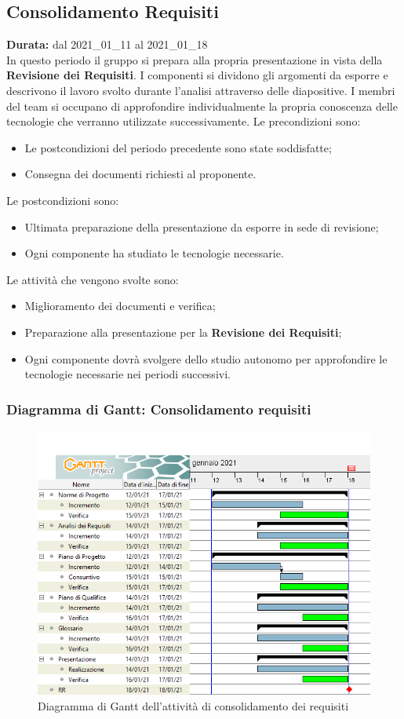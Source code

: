 \subsection{Consolidamento Requisiti}
\label{consolidamento_requisiti}
\textbf{Durata:} dal 2021\_01\_11 al 2021\_01\_18\\
In questo periodo il gruppo si prepara alla propria presentazione in vista della \textbf{Revisione dei Requisiti}.
I componenti si dividono gli argomenti da esporre e descrivono il lavoro svolto durante l'analisi attraverso delle diapositive.
I membri del team si occupano di approfondire individualmente la propria conoscenza delle tecnologie che verranno utilizzate successivamente.
Le precondizioni sono:
\begin{itemize}
    \item Le postcondizioni del periodo precedente sono state soddisfatte;
    \item Consegna dei documenti richiesti al proponente.
\end{itemize}
Le postcondizioni sono:
\begin{itemize}
    \item Ultimata preparazione della presentazione da esporre in sede di revisione;
    \item Ogni componente ha studiato le tecnologie necessarie.
\end{itemize}
Le attività che vengono svolte sono:
\begin{itemize}
    \item Miglioramento dei documenti e verifica;
    \item Preparazione alla presentazione per la \textbf{Revisione dei Requisiti};
    \item Ogni componente dovrà svolgere dello studio autonomo per approfondire le tecnologie necessarie nei periodi successivi.  
\end{itemize}
\newpage
\subsubsection{Diagramma di Gantt: Consolidamento requisiti}
\begin{figure}[ht]
    \centering
    \includegraphics[width=\textwidth]{Immagini/GanttConsolidamentoRequisiti}
    \caption{Diagramma di Gantt dell'attività di consolidamento dei requisiti}
\end{figure}